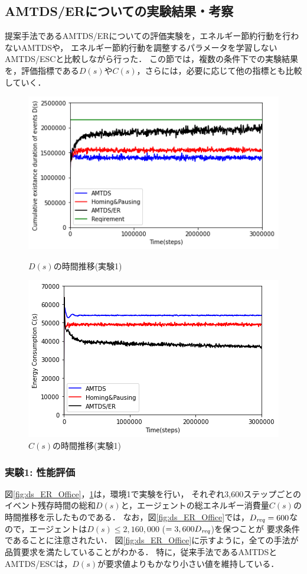 \documentclass[12pt,a4j,twoside]{jarticle}
\def\Dreq{{D_{\it req}}}
\begin{document}
  \subsection{AMTDS/ERについての実験結果・考察}\label{result_ER}
  提案手法であるAMTDS/ERについての評価実験を，エネルギー節約行動を行わないAMTDSや，
  エネルギー節約行動を調整するパラメータを学習しないAMTDS/ESCと比較しながら行った．
  この節では，複数の条件下での実験結果を，評価指標である$D(s)$や$C(s)$，さらには，必要に応じて他の指標とも比較していく．

  
  \begin{figure}
    \centering
    \includegraphics[width=0.9\hsize]{figures/ds_graph_3600_ave_ER_Office_600.png}
    \caption{$D(s)$の時間推移(実験1)}
    \label{fig:ds_ER_Office}
    \vspace{12pt}
    \centering
    \includegraphics[width=0.9\hsize]{figures/cs_graph_3600_ave_ER_Office_600.png}
    \caption{$C(s)$の時間推移(実験1)}
    \label{fig:cs_ER_Office}
  \end{figure}
  

  \subsubsection{実験1: 性能評価}\label{ex:ER1}
  図\ref{fig:ds_ER_Office}，\ref{fig:cs_ER_Office}は，環境1で実験を行い，
  それぞれ3,600ステップごとのイベント残存時間の総和$D(s)$と，エージェントの総エネルギー消費量$C(s)$の時間推移を示したものである．
  なお，図\ref{fig:ds_ER_Office}では，$\Dreq=600$なので，エージェントは$D(s)\leq 2,160,000$ ($=3,600\Dreq$)を保つことが
  要求条件であることに注意されたい．
  図\ref{fig:ds_ER_Office}に示すように，全ての手法が品質要求を満たしていることがわかる．
  特に，従来手法であるAMTDSとAMTDS/ESCは，$D(s)$が要求値よりもかなり小さい値を維持している．
  \par
\end{document}
